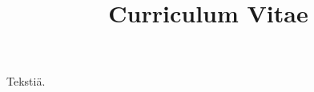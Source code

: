 \documentclass{article}
\title{Curriculum Vitae}
\begin{document}
	\maketitle
	Tekstiä. 
\end{document}
